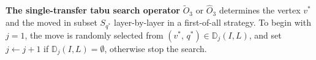 \documentclass[12pt, a4paper]{article}%
\DeclareMathOperator*{\argopt}{\ensuremath{arg\,opt}}
\DeclareMathOperator*{\opt}{\ensuremath{opt}}
\numberwithin{equation}{section}
\theoremstyle{plain}
\begin{document}
			
			
			
			
			\textbf{The single-transfer tabu search operator} $\widetilde{O}_3$ or $\widehat{O}_3$ determines the vertex $v^*$ and the moved in subset $S_{q^*}$ layer-by-layer in a first-of-all strategy. To begin with $j=1$, the move is randomly selected from $	({v}^*,\,{q}^*)\in  \mathbb{D}_j(I,L)$, and set $j\leftarrow j+1$ if $\mathbb{D}_j(I,L)=\emptyset$, otherwise stop the search.
			
			
			
\end{document}
